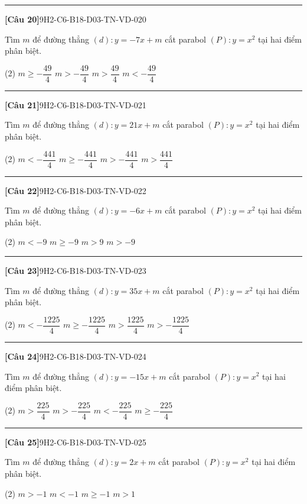 \documentclass[12pt,a4paper]{article}
\newif\ifloigiai
\newenvironment{cauhoi}[2]{%
  \par\medskip\noindent\rule{\textwidth}{0.4pt}\par\nopagebreak
  \noindent\textbf{[#1]}\hfill{\scriptsize\ttfamily #2}\par\nopagebreak\smallskip}{\par}
\newcommand{\dapan}[1]{\ifloigiai\par\smallskip\noindent\textit{Đáp án:} \textbf{#1}\par\fi}
\begin{document}
\begin{cauhoi}{Câu 20}{9H2-C6-B18-D03-TN-VD-020}
Tìm $m$ để đường thẳng $(d): y=-7x+m$ cắt parabol $(P): y=x^{2}$ tại hai điểm phân biệt.
\begin{tasks}(2)
\task $m\ge -\dfrac{49}{4}$
\task $m>-\dfrac{49}{4}$
\task $m>\dfrac{49}{4}$
\task $m<-\dfrac{49}{4}$
\end{tasks}
\dapan{B}
\end{cauhoi}
\begin{cauhoi}{Câu 21}{9H2-C6-B18-D03-TN-VD-021}
Tìm $m$ để đường thẳng $(d): y=21x+m$ cắt parabol $(P): y=x^{2}$ tại hai điểm phân biệt.
\begin{tasks}(2)
\task $m<-\dfrac{441}{4}$
\task $m\ge -\dfrac{441}{4}$
\task $m>-\dfrac{441}{4}$
\task $m>\dfrac{441}{4}$
\end{tasks}
\dapan{C}
\end{cauhoi}
\begin{cauhoi}{Câu 22}{9H2-C6-B18-D03-TN-VD-022}
Tìm $m$ để đường thẳng $(d): y=-6x+m$ cắt parabol $(P): y=x^{2}$ tại hai điểm phân biệt.
\begin{tasks}(2)
\task $m<-9$
\task $m\ge -9$
\task $m>9$
\task $m>-9$
\end{tasks}
\dapan{D}
\end{cauhoi}
\begin{cauhoi}{Câu 23}{9H2-C6-B18-D03-TN-VD-023}
Tìm $m$ để đường thẳng $(d): y=35x+m$ cắt parabol $(P): y=x^{2}$ tại hai điểm phân biệt.
\begin{tasks}(2)
\task $m<-\dfrac{1225}{4}$
\task $m\ge -\dfrac{1225}{4}$
\task $m>\dfrac{1225}{4}$
\task $m>-\dfrac{1225}{4}$
\end{tasks}
\dapan{D}
\end{cauhoi}
\begin{cauhoi}{Câu 24}{9H2-C6-B18-D03-TN-VD-024}
Tìm $m$ để đường thẳng $(d): y=-15x+m$ cắt parabol $(P): y=x^{2}$ tại hai điểm phân biệt.
\begin{tasks}(2)
\task $m>\dfrac{225}{4}$
\task $m>-\dfrac{225}{4}$
\task $m<-\dfrac{225}{4}$
\task $m\ge -\dfrac{225}{4}$
\end{tasks}
\dapan{B}
\end{cauhoi}
\begin{cauhoi}{Câu 25}{9H2-C6-B18-D03-TN-VD-025}
Tìm $m$ để đường thẳng $(d): y=2x+m$ cắt parabol $(P): y=x^{2}$ tại hai điểm phân biệt.
\begin{tasks}(2)
\task $m>-1$
\task $m<-1$
\task $m\ge -1$
\task $m>1$
\end{tasks}
\dapan{A}
\end{cauhoi}
\end{document}
